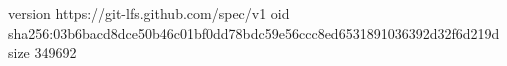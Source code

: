 version https://git-lfs.github.com/spec/v1
oid sha256:03b6bacd8dce50b46c01bf0dd78bdc59e56ccc8ed6531891036392d32f6d219d
size 349692
